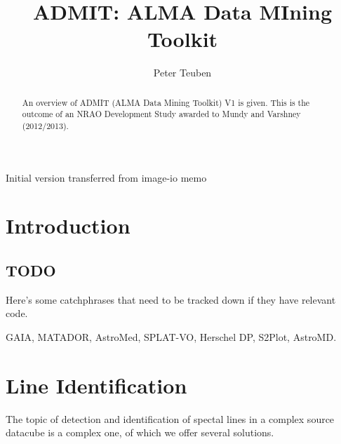 \documentclass[preprint]{aastex} %
\begin{document}

\title{ADMIT: ALMA Data MIning Toolkit}

\author{Peter Teuben}

\begin{abstract}

An overview of ADMIT (ALMA Data Mining Toolkit) V1
is given. This is the outcome of an NRAO Development
Study awarded to Mundy and Varshney (2012/2013).

\end{abstract}


\ChangeRecordBegin
{}
{Initial version transferred from image-io memo}
\ChangeRecordEnd


\section{Introduction}



\subsection{TODO}

Here's some catchphrases that need to be tracked down if they have
relevant code.

GAIA, MATADOR, AstroMed, SPLAT-VO, Herschel DP, S2Plot, AstroMD. 

\section{Line Identification}


The topic of detection and identification of spectal
lines in a complex source datacube is a complex one,
of which we offer several solutions. 
\end{document}
